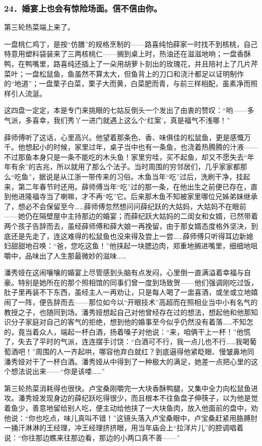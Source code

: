\subsubsection*{24．婚宴上也会有惊险场面。信不信由你。}
\par 第三轮热菜端上来了。
\par 一盘桃仁鸡丁，是按“仿膳”的规格烹制的——路喜纯怕薛家一时找不到核桃，自己特意用塑料袋装来了三两核桃仁——搁到桌上时，热油还在滋滋地响；一盘香酥鸭，在鸭嘴里，路喜纯还插上了一朵用胡萝卜刻出的玫瑰花，并且陪衬上了几片芹菜叶；一盘松鼠鱼，鱼虽然不算太大，但鱼背上的刀口和浇汁都足以证明制作的“地道”；一盘栗子白菜，栗子大而黄，白菜肥而青，与前三样相配，虽素净而照样引人流涎。
\par 这四盘一定定，本是专门来挑眼的七姑反倒头一个发出了由衷的赞叹：“哟——多气派，多喜幸，我们秀丫一进门就遇上这么个‘红案’，真是福气不浅哪！”
\par 薛师傅听了这话，心里高兴。他望着那条色、香、味俱佳的松鼠鱼，更是感慨万千。他想起小的时候，家里过年，桌子当中也有一条鱼，也浇着热腾腾的汁液——不过那鱼本身只是一条不能吃的木头鱼！家里穷哇，买不起鱼，却又不愿失去“年年有余”的吉兆，所以就用了那么个法子。当时周围的穷邻居们，几乎家家都那么“吃鱼”，据说是从江浙一带传来的习俗。木鱼当年“吃”过后，洗刷干净，挂起来，第二年春节时还用。薛师傅当年“吃”过的那一条，在他出生之前便已存在，直到他进隆福寺当了喇嘛，才不再“吃”它。后来那木鱼不知被家里哪位兄姊弟妹继承了，想必不会保留至今……薛师傅忽然想问问薛纪跃的大姑妈，大姑妈不在眼前——她仍在隔壁屋中主持那边的婚宴；而薛纪跃大姑妈的二闺女和女婿，已然带着两个孩子告辞而去，虽经薛师傅和薛大娘一再挽留，由于那女婿态度格外坚决，到底还是先走了，连这难得的松鼠鱼也没来得及尝上一尝……薛师傅只听得耳边新媳妇甜甜地召唤：“爸，您吃这鱼！”他挟起一块腮边肉，郑重地搁进嘴里，细细地咀嚼中，品味出了人生那最微妙的滋味……
\par 潘秀娅在这闹嚷嚷的婚宴上尽管感到头脑有点发闷，心里倒一直满溢着幸福与自豪。特别是她所在的那个照相馆的同事们曾一度到场致贺——他们强调刚吃过饭，肚子里再装不下东西，虽经主人一再劝让，只是每人喝了一盅喜酒，或坐或立地嬉闹了一阵，便告辞而去——那位如今以“开眼技术”高超而在照相业当中小有名气的教授之子，也随同到场。潘秀娅想起自己对他曾经存在过的想法，想起他和他那知识分子家庭对自己的客气的拒绝，想到他的婚事至今似乎仍然没有着落……不知怎的，竟当着众人，端起一杯白酒，扬着嗓子对他说：“来，咱俩干上一杯！”他慌了，失去了平时的气派，连连摆手讨饶：“白酒可不行，我一点儿也不行……我喝葡萄酒吧！”周围的人一齐起哄，哪容他弃白就红？到底逼得他紧眨眼、慢皱鼻地同潘秀娅对干了一杯白酒。潘秀娅从中得到了一种极大的满足，她差一点把心里的这个想法说出来——“你是该喽……”
\par 第三轮热菜消耗得也很快。卢宝桑刚嚼完一大块香酥鸭腿，又集中全力向松鼠鱼进攻。潘秀娅发现身边的薛纪跃吃得很少，而且根本不往鱼盘子伸筷子，以为他是觉着鱼少，善意地留给别人吃，便主动给他挟了一大块鱼肉，放入他面前的盘中，劝他说：“你也吃点，味儿真叫不错！”这镜头落入卢宝桑眼中，卢宝桑赶紧用胳膊肘一捅汗淋淋的王经理，冲王经理挤挤眼，用当年庙会上“拉洋片儿”的腔调唱着说：“你往那边瞧来往那边看，那边的小两口真不善——”
